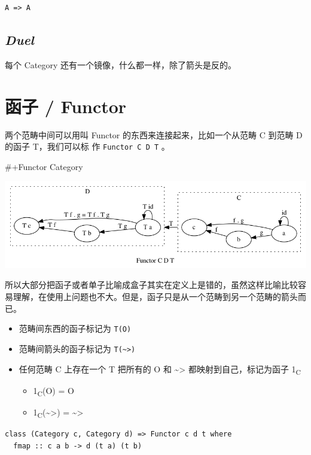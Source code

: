 \documentclass[letterspacing]{tufte-book}
\begin{document}
\lstset{language=scala,label= ,caption= ,captionpos=b,numbers=none}
\begin{lstlisting}
A => A
\end{lstlisting}
\section{\emph{Duel}}
\label{sec:org5481e33}
每个 Category 还有一个镜像，什么都一样，除了箭头是反的。

\chapter{函子 / Functor}
\label{sec:orge4cfc5a}
两个范畴中间可以用叫 Functor 的东西来连接起来，比如一个从范畴 C 到范畴 D 的函子 T，我们可以标
作 \texttt{Functor C D T} 。

\#+Functor Category
\begin{center}
\includegraphics[width=.9\linewidth]{images/functor.png}
\end{center}

所以大部分把函子或者单子比喻成盒子其实在定义上是错的，虽然这样比喻比较容易理解，在使用上问题也不大。但是，函子只是从一个范畴到另一个范畴的箭头而已。

\begin{itemize}
\item 范畴间东西的函子标记为 \texttt{T(O)}
\item 范畴间箭头的函子标记为 \texttt{T(\textasciitilde{}>)}
\item 任何范畴 C 上存在一个 T 把所有的 O 和 \textasciitilde{}> 都映射到自己，标记为函子 1\textsubscript{C}
\begin{itemize}
\item 1\textsubscript{C}(O) = O
\item 1\textsubscript{C}(\textasciitilde{}>) = \textasciitilde{}>
\end{itemize}
\end{itemize}

\begin{lstlisting}
class (Category c, Category d) => Functor c d t where
  fmap :: c a b -> d (t a) (t b)
\end{lstlisting}
\end{document}
